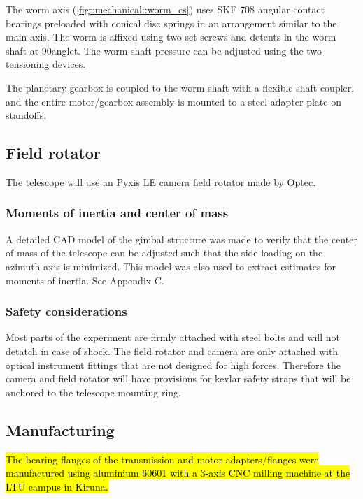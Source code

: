 The worm axis (\ref{fig::mechanical::worm_cs}) uses SKF 708 angular contact bearings preloaded with conical disc springs in an arrangement similar to the main axis. The worm is affixed using two set screws and detents in the worm shaft at 90\degree anglet. The worm shaft pressure can be adjusted using the two tensioning devices. 

The planetary gearbox is coupled to the worm shaft with a flexible shaft coupler, and the entire motor/gearbox assembly is mounted to a steel adapter plate on standoffs. 

\subsection{Field rotator}

The telescope will use an Pyxis LE camera field rotator made by Optec. 

\subsubsection{Moments of inertia and center of mass}

A detailed CAD model of the gimbal structure was made to verify that the center of mass of the telescope can be adjusted such that the side loading on the azimuth axis is minimized. This model was also used to extract estimates for moments of inertia. See Appendix C.

\subsubsection{Safety considerations}

Most parts of the experiment are firmly attached with steel bolts and will not detatch in case of shock. The field rotator and camera are only attached with optical instrument fittings that are not designed for high forces. Therefore the camera and field rotator will have provisions for kevlar safety straps that will be anchored to the telescope mounting ring. 

\subsection{Manufacturing}

\hl{The bearing flanges of the transmission and motor adapters/flanges were manufactured using aluminium 60601 with a 3-axis CNC milling machine at the LTU campus in Kiruna.}

